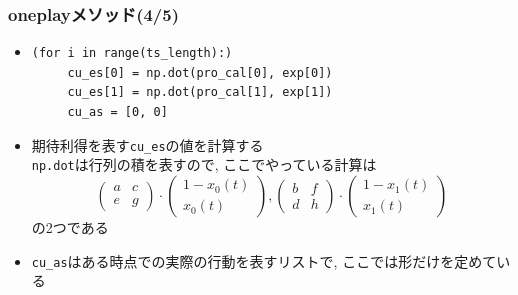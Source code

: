\documentclass[dvipdfmx,fleqn,handout]{beamer}
\begin{document}
\begin{frame}[fragile]%
\frametitle{oneplayメソッド(4/5)}
\begin{itemize}\setlength{\parskip}{0.5em}
\item
\footnotesize
\begin{verbatim}   
(for i in range(ts_length):)
     cu_es[0] = np.dot(pro_cal[0], exp[0])
     cu_es[1] = np.dot(pro_cal[1], exp[1])
     cu_as = [0, 0]
\end{verbatim}\pause
\normalsize
\item
期待利得を表す\verb|cu_es|の値を計算する\pause\\
\verb|np.dot|は行列の積を表すので, ここでやっている計算は
\footnotesize
\begin{equation*}
\begin{pmatrix}
a & c\\
e & g
\end{pmatrix}\cdot
\begin{pmatrix}
1-x_0(t) \\
x_0(t)
\end{pmatrix}
, 
\begin{pmatrix}
b & f\\
d & h
\end{pmatrix}\cdot
\begin{pmatrix}
1-x_1(t)\\
x_1(t)
\end{pmatrix}
\end{equation*}
\normalsize
の2つである\pause
\item
\verb|cu_as|はある時点での実際の行動を表すリストで, ここでは形だけを定めている
\end{itemize}
\end{frame}
\end{document}
